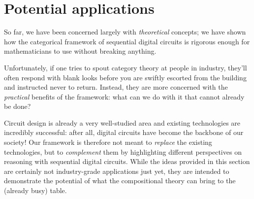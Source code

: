 \chapter{Potential applications}\label{sec:semantics-applications}

So far, we have been concerned largely with \emph{theoretical} concepts; we have
shown how the categorical framework of sequential digital circuits is rigorous
enough for mathematicians to use without breaking anything.

Unfortunately, if one tries to spout category theory at people in industry,
they'll often respond with blank looks before you are swiftly escorted from the
building and instructed never to return.
Instead, they are more concerned with the \emph{practical} benefits of the
framework: what can we do with it that cannot already be done?

Circuit design is already a very well-studied area and existing technologies are
incredibly successful: after all, digital circuits have become the backbone of
our society!
Our framework is therefore not meant to \emph{replace} the existing
technologies, but to \emph{complement} them by highlighting different
perspectives on reasoning with sequential digital circuits.
While the ideas provided in this section are certainly not industry-grade
applications just yet, they are intended to demonstrate the potential of what
the compositional theory can bring to the (already busy) table.








